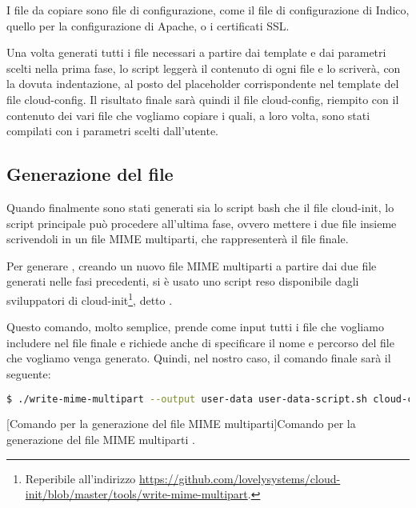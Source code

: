             I file da copiare sono file di configurazione, come il file di configurazione di Indico, quello per la configurazione di Apache, o i certificati \ac{SSL}.
            
            Una volta generati tutti i file necessari a partire dai template e dai parametri scelti nella prima fase, lo script leggerà il contenuto di ogni file e lo scriverà, con la dovuta indentazione, al posto del placeholder corrispondente nel template del file cloud-config. Il risultato finale sarà quindi il file cloud-config, riempito con il contenuto dei vari file che vogliamo copiare i quali, a loro volta, sono stati compilati con i parametri scelti dall'utente.
        
        \subsection{Generazione del file } \label{subsec:cd;dci;generazione_user-data}
        
            Quando finalmente sono stati generati sia lo script bash che il file cloud-init, lo script principale può procedere all'ultima fase, ovvero mettere i due file insieme scrivendoli in un file \ac{MIME} multiparti, che rappresenterà il file  finale.
            
            Per generare , creando un nuovo file \ac{MIME} multiparti a partire dai due file generati nelle fasi precedenti, si è usato uno script reso disponibile dagli sviluppatori di cloud-init\footnote{Reperibile all'indirizzo \url{https://github.com/lovelysystems/cloud-init/blob/master/tools/write-mime-multipart}.}, detto .
            
            Questo comando, molto semplice, prende come input tutti i file che vogliamo includere nel file finale e richiede anche di specificare il nome e percorso del file che vogliamo venga generato. Quindi, nel nostro caso, il comando finale sarà il seguente:
            
            \begin{center}
                \begin{lstlisting}[language=bash, gobble=18]
                    $ ./write-mime-multipart --output user-data user-data-script.sh cloud-config
                \end{lstlisting}
                \captionsetup{textformat=empty,labelformat=empty} \vspace{-2em}
                [Comando per la generazione del file MIME multiparti]{Comando per la generazione del file \ac{MIME} multiparti .}
            \end{center}
            
